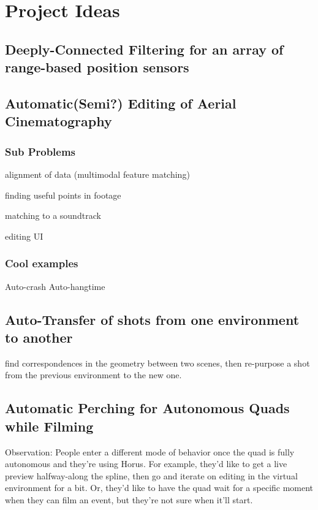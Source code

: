 \chapter{Project Ideas}

\section{Deeply-Connected Filtering for an array of range-based position sensors}

\section{Automatic(Semi?) Editing of Aerial Cinematography}

\subsection{Sub Problems}

alignment of data (multimodal feature matching)

finding useful points in footage

matching to a soundtrack

editing UI

\subsection{Cool examples}
Auto-crash
Auto-hangtime

\section{Auto-Transfer of shots from one environment to another}

find correspondences in the geometry between two scenes, then re-purpose a shot from the previous environment to the new one.

\section{Automatic Perching for Autonomous Quads while Filming}

Observation: People enter a different mode of behavior once the quad is fully autonomous and they're using Horus. For example, they'd like to get a live preview halfway-along the spline, then go and iterate on editing in the virtual environment for a bit. Or, they'd like to have the quad wait for a specific moment when they can film an event, but they're not sure when it'll start.

